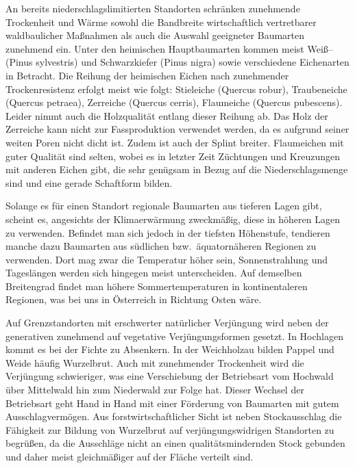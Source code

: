 \documentclass[twocolumn]{scrartcl}
\begin{document}
An bereits niederschlagslimitierten Standorten schränken zunehmende
Trockenheit und Wärme sowohl die Bandbreite wirtschaftlich
vertretbarer waldbaulicher Maßnahmen als auch die Auswahl geeigneter
Baumarten zunehmend ein. Unter den heimischen Hauptbaumarten kommen
meist Weiß-- (Pinus sylvestris) und Schwarzkiefer (Pinus
nigra) sowie verschiedene Eichenarten in Betracht. Die Reihung der
heimischen Eichen nach zunehmender Trockenresistenz erfolgt meist wie
folgt: Stieleiche (Quercus robur), Traubeneiche (Quercus petraea),
Zerreiche (Quercus cerris), Flaumeiche (Quercus pubescens). Leider
nimmt auch die Holzqualität entlang dieser Reihung ab. Das Holz der
Zerreiche kann nicht zur Fassproduktion verwendet werden, da es
aufgrund seiner weiten Poren nicht dicht ist. Zudem ist auch der
Splint breiter. Flaumeichen mit guter Qualität sind selten, wobei es
in letzter Zeit Züchtungen und Kreuzungen mit anderen Eichen gibt, die
sehr genügsam in Bezug auf die Niederschlagsmenge sind und eine gerade
Schaftform bilden.

Solange es für einen Standort regionale Baumarten aus tieferen Lagen gibt,
scheint es, angesichts der Klimaerwärmung zweckmäßig, diese in höheren Lagen zu
verwenden. Befindet man sich jedoch in der tiefsten Höhenstufe, tendieren manche
dazu Baumarten aus südlichen bzw.\ äquatornäheren Regionen zu verwenden. Dort
mag zwar die Temperatur höher sein, Sonnenstrahlung und Tageslängen werden sich
hingegen meist unterscheiden. Auf demselben Breitengrad findet man höhere
Sommertemperaturen in kontinentaleren Regionen, was bei uns in Österreich in
Richtung Osten wäre.

Auf Grenzstandorten mit erschwerter natürlicher Verjüngung wird neben
der generativen zunehmend auf vegetative Verjüngungsformen gesetzt. In
Hochlagen kommt es bei der Fichte zu Absenkern. In der Weichholzau
bilden Pappel und Weide häufig Wurzelbrut.
Auch mit zunehmender Trockenheit wird die Verjüngung schwieriger, was eine
Verschiebung der Betriebsart vom Hochwald über Mittelwald hin zum Niederwald zur
Folge hat. Dieser Wechsel der Betriebsart geht Hand in Hand mit einer Förderung
von Baumarten mit gutem Ausschlagvermögen. Aus forstwirtschaftlicher Sicht ist
neben Stockausschlag die Fähigkeit zur Bildung von Wurzelbrut auf
verjüngungswidrigen Standorten zu begrüßen, da die Ausschläge nicht an einen
qualitätsmindernden Stock gebunden und daher meist gleichmäßiger auf der Fläche
verteilt sind.
\end{document}
